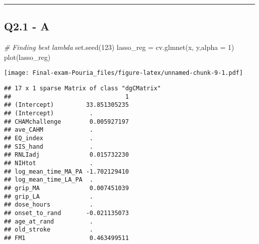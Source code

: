 \documentclass[
]{article}
\newenvironment{Shaded}{\begin{snugshade}}{\end{snugshade}}
\newcommand{\AttributeTok}[1]{\textcolor[rgb]{0.77,0.63,0.00}{#1}}
\newcommand{\CommentTok}[1]{\textcolor[rgb]{0.56,0.35,0.01}{\textit{#1}}}
\newcommand{\DecValTok}[1]{\textcolor[rgb]{0.00,0.00,0.81}{#1}}
\newcommand{\FloatTok}[1]{\textcolor[rgb]{0.00,0.00,0.81}{#1}}
\newcommand{\FunctionTok}[1]{\textcolor[rgb]{0.00,0.00,0.00}{#1}}
\newcommand{\NormalTok}[1]{#1}
\newcommand{\OtherTok}[1]{\textcolor[rgb]{0.56,0.35,0.01}{#1}}
\newcommand{\SpecialCharTok}[1]{\textcolor[rgb]{0.00,0.00,0.00}{#1}}
\newcommand{\StringTok}[1]{\textcolor[rgb]{0.31,0.60,0.02}{#1}}
\begin{document}
\begin{center}\rule{0.5\linewidth}{0.5pt}\end{center}

\hypertarget{q2.1---a}{%
\subsection{Q2.1 - A}\label{q2.1---a}}

\begin{Shaded}
\end{Shaded}

\begin{Shaded}
\begin{Highlighting}[]
\CommentTok{\# Finding best lambda}
\FunctionTok{set.seed}\NormalTok{(}\DecValTok{123}\NormalTok{)}
\NormalTok{lasso\_reg }\OtherTok{=} \FunctionTok{cv.glmnet}\NormalTok{(x, y,}\AttributeTok{alpha =} \DecValTok{1}\NormalTok{)}
\FunctionTok{plot}\NormalTok{(lasso\_reg)}
\end{Highlighting}
\end{Shaded}

\texttt{[image: Final-exam-Pouria\_files/figure-latex/unnamed-chunk-9-1.pdf]}

\begin{Shaded}
\end{Shaded}

\begin{verbatim}
## 17 x 1 sparse Matrix of class "dgCMatrix"
##                                1
## (Intercept)         33.851305235
## (Intercept)          .          
## CHAMchallenge        0.005927197
## ave_CAHM             .          
## EQ_index             .          
## SIS_hand             .          
## RNLIadj              0.015732230
## NIHtot               .          
## log_mean_time_MA_PA -1.702129410
## log_mean_time_LA_PA  .          
## grip_MA              0.007451039
## grip_LA              .          
## dose_hours           .          
## onset_to_rand       -0.021135073
## age_at_rand          .          
## old_stroke           .          
## FM1                  0.463499511
\end{verbatim}
\end{document}
